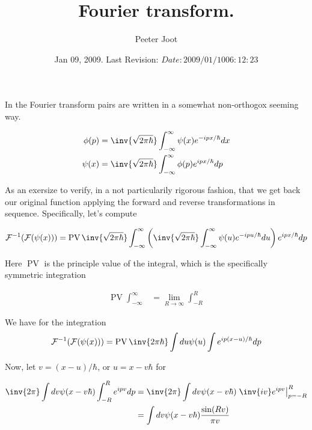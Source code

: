 \documentclass{article}
\title{ Fourier transform. }
\author{Peeter Joot}
\date{ Jan 09, 2009.  Last Revision: $Date: 2009/01/10 06:12:23 $ }
\newcommand{\FF}[0]{\mathcal{F}}
\DeclareMathOperator{\PV}{PV}
\begin{document}
\maketitle{}

In \cite{mcmahon2005qmd} the Fourier transform pairs are written in a somewhat 
non-orthogox seeming way.

\begin{align*}
\phi(p) &= \inv{\sqrt{2\pi\hbar}} \int_{-\infty}^\infty \psi(x) e^{-ipx/\hbar} dx \\
\psi(x) &= \inv{\sqrt{2\pi\hbar}} \int_{-\infty}^\infty \phi(p) e^{ipx/\hbar} dp \\
\end{align*}

As an exersize to verify, in a not particularily rigorous fashion, that we get back our original function applying the forward and reverse transformations
in sequence.  Specifically, let's compute

\begin{align*}
\FF^{-1}(\FF(\psi(x)))
&= \PV \inv{\sqrt{2\pi\hbar}} \int_{-\infty}^\infty \left(\inv{\sqrt{2\pi\hbar}} \int_{-\infty}^\infty \psi(u) e^{-ipu/\hbar} du \right) e^{ipx/\hbar} dp \\
\end{align*}

Here $\PV$ is the principle value of the integral, which is the specifically symmetric integration

\begin{align*}
\PV \int_{-\infty}^\infty &= \lim_{R \rightarrow \infty} \int_{-R}^R
\end{align*}

We have for the integration
\begin{align*}
\FF^{-1}(\FF(\psi(x)))
&= \PV \inv{{2\pi\hbar}} \int du \psi(u) \int e^{i p (x-u)/\hbar} dp \\
\end{align*}

Now, let $v = (x-u)/\hbar$, or $u=x-v\hbar$ for

\begin{align*}
\inv{{2\pi}} \int dv \psi(x -v\hbar) \int_{-R}^R e^{i p v} dp 
&= \inv{{2\pi}} \int dv \psi(x - v\hbar) \left. \inv{i v} e^{i p v} \right\vert_{p=-R}^R \\
&= \int dv \psi(x - v\hbar) \frac{\sin(R v)}{\pi v} \\
\end{align*}
\end{document}
